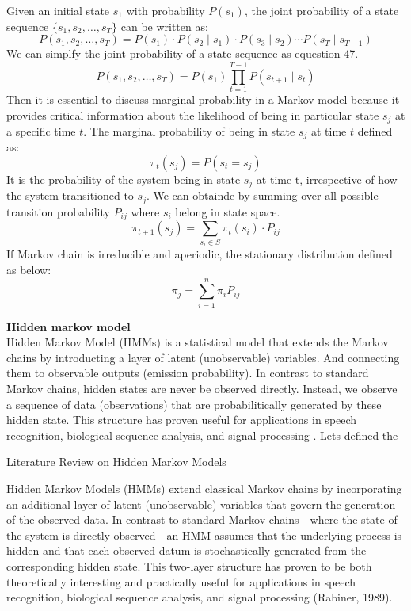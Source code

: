 \documentclass[12pt,a4paper]{article}
\begin{document}
Given an initial state \( s_1 \) with probability \( P(s_1) \), the joint probability of a state sequence \( \{s_1, s_2, \dots, s_T\} \) can be written as:
\begin{equation}
    P(s_1, s_2, \dots, s_T) = P(s_1) \cdot P(s_2 \mid s_1) \cdot P(s_3 \mid s_2) \cdots P(s_T \mid s_{T-1})
\end{equation}
We can simplfy the joint probability of a state sequence as equestion 47.
\begin{equation}
    P(s_1, s_2, \dots, s_T) = P(s_1) \prod_{t=1}^{T-1} P(s_{t+1} \mid s_{t})
\end{equation}
Then it is essential to discuss marginal probability in a Markov model because it provides critical information about the likelihood of being in particular state $s_j$ at a specific time $t$. The marginal probability of being in state $s_j$ at time $t$ defined as:
\begin{equation}
    \pi_t(s_j) = P(s_t=s_j)
\end{equation}
It is the probability of the system being in state $s_j$ at time t, irrespective of how the system transitioned to $s_j$. We can obtainde by summing over all possible transition probability $P_{ij}$ where $s_i$ belong in state space. 
\begin{equation}
    \pi_{t+1}(s_j) = \sum_{s_i \in S} \pi_t(s_i) \cdot P_{ij}
\end{equation}
If Markov chain is irreducible and aperiodic, the stationary distribution defined as below:
\begin{equation}
    \pi_j = \sum_{i=1}^{n} \pi_i P_{ij}
\end{equation}

\newpage
\textbf{Hidden markov model}
\\[1ex]
Hidden Markov Model (HMMs) is a statistical model that extends the Markov chains by introducting a layer of latent (unobservable) variables. And connecting them to observable outputs (emission probability). In contrast to standard Markov chains, hidden states are never be observed directly. Instead, we observe a sequence of data (observations) that are probabilitically generated by these hidden state. This structure has proven useful for applications in speech recognition, biological sequence analysis, and signal processing \parencite{rabiner1989atutorial}. Lets defined the 
\newpage

Literature Review on Hidden Markov Models

Hidden Markov Models (HMMs) extend classical Markov chains by incorporating an additional layer of latent (unobservable) variables that govern the generation of the observed data. In contrast to standard Markov chains—where the state of the system is directly observed—an HMM assumes that the underlying process is hidden and that each observed datum is stochastically generated from the corresponding hidden state. This two-layer structure has proven to be both theoretically interesting and practically useful for applications in speech recognition, biological sequence analysis, and signal processing (Rabiner, 1989).
\end{document}
